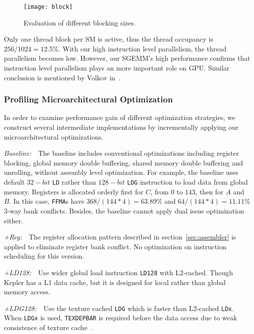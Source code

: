 \begin{figure}[htbp]
\begin{center}
\texttt{[image: block]}
    \caption{Evaluation of different blocking sizes.} %
\label{fig:block}
\end{center}
\end{figure}

Only one thread block per SM is active, thus the thread occupancy is $256/1024=12.5\%$.
With our high instruction level parallelism, the thread parallelism becomes low.
However, our SGEMM's high performance confirms that instruction level parallelism plays an more important role on GPU.
Similar conclusion is mentioned by Volkov in~\cite{volkov2010better}.

\subsubsection{Profiling Microarchitectural Optimization}

In order to examine performance gain of different optimization strategies, we construct several intermediate 
implementations by incrementally applying our microarchitectural optimizations.

{\it Baseline:}~~The baseline includes conventional optimizations including register blocking, global
memory double buffering, shared memory double buffering and unrolling, without assembly level optimization.
For example, the baseline uses default $32-bit$ {\tt LD} rather than $128-bit$ {\tt LDG} instruction to load data from global memory.
Registers is allocated orderly first for $C$, from $0$ to $143$, then for $A$ and $B$. 
In this case, {\tt FFMA}s have $368/(144*4)=63.89\%$  and $64/(144*4)=11.11\%$ 3-way bank conflicts. 
Besides, the baseline cannot apply dual issue optimization either.

{\it +Reg:}~~The register allocation pattern described in section~\ref{sec:assembler} is applied to eliminate register bank conflict. 
No optimization on instruction scheduling for this version.

{\it +LD128:}~~Use wider global load instruction {\tt LD128} with L2-cached.
Though Kepler has a L1 data cache, but it is designed for local rather than global memory access. ~\cite{xx}

{\it +LDG128:}~~Use the texture cached {\tt LDG} which is faster than L2-cached {\tt LDx}. 
When {\tt LDGx} is used, {\tt TEXDEPBAR} is required before the data access due to weak consistence of texture cache~\cite{lukyanov2014efficient}.

